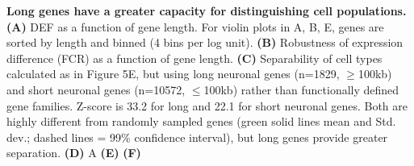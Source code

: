 \textbf{Long genes have a greater capacity for distinguishing cell populations. (A)} DEF as a function of gene length. For violin plots in A, B, E, genes are sorted by length and binned (4 bins per log unit). \textbf{(B)} Robustness of expression difference (FCR) as a function of gene length. \textbf{(C)} Separability of cell types calculated as in Figure 5E, but using long neuronal genes (n=1829, $\geq$100kb) and short neuronal genes (n=10572, $\leq$100kb) rather than functionally defined gene families. Z-score is 33.2 for long and 22.1 for short neuronal genes. Both are highly different from randomly sampled genes (green solid lines mean and Std. dev.; dashed lines = 99\% confidence interval), but long genes provide greater separation. \textbf{(D)} A \textbf{(E)}  \textbf{(F)}   